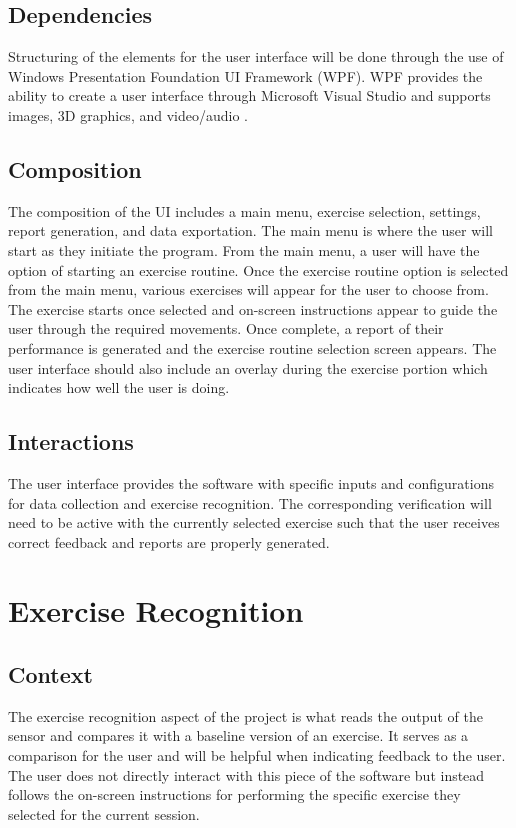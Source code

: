 \documentclass[onecolumn, draftclsnofoot,10pt, compsoc]{IEEEtran}
\begin{document}
\subsection{Dependencies}
Structuring of the elements for the user interface will be done through the use of Windows Presentation Foundation UI Framework (WPF). WPF provides the ability to create a user interface through Microsoft Visual Studio and supports images, 3D graphics, and video/audio \cite{WPFSamples}. 

\subsection{Composition}
The composition of the UI includes a main menu, exercise selection, settings, report generation, and data exportation. The main menu is where the user will start as they initiate the program. From the main menu, a user will have the option of starting an exercise routine. Once the exercise routine option is selected from the main menu, various exercises will appear for the user to choose from. The exercise starts once selected and on-screen instructions appear to guide the user through the required movements. Once complete, a report of their performance is generated and the exercise routine selection screen appears. The user interface should also include an overlay during the exercise portion which indicates how well the user is doing.  

\subsection{Interactions}
The user interface provides the software with specific inputs and configurations for data collection and exercise recognition. The corresponding verification will need to be active with the currently selected exercise such that the user receives correct feedback and reports are properly generated.  

\section{Exercise Recognition}
\subsection{Context}
The exercise recognition aspect of the project is what reads the output of the sensor and compares it with a baseline version of an exercise. It serves as a comparison for the user and will be helpful when indicating feedback to the user. The user does not directly interact with this piece of the software but instead follows the on-screen instructions for performing the specific exercise they selected for the current session.  
\end{document}

